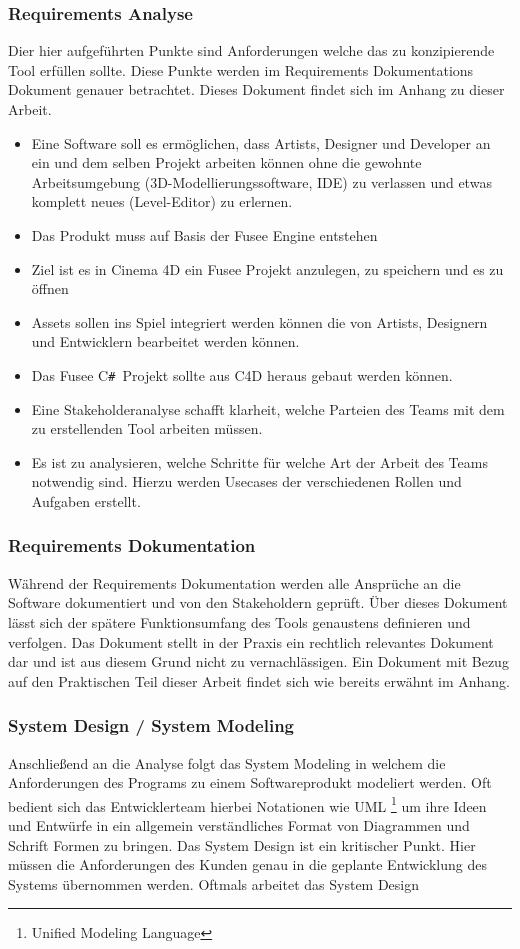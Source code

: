 \documentclass[pagesize, paper=a4, fontsize=12pt, titlepage=true, headings=small, headnosepline, abstractoff, liststotoc, nochapterprefix, plainheadsepline, twoside]{scrreprt}
\newcommand{\CSS}{C\texttt{\# }}
\begin{document}
\subsubsection{Requirements Analyse}
Dier hier aufgeführten Punkte sind Anforderungen welche das zu konzipierende Tool erfüllen sollte. Diese Punkte werden im Requirements Dokumentations Dokument genauer betrachtet. Dieses Dokument findet sich im Anhang zu dieser Arbeit.
\begin{itemize}
\item Eine Software soll es ermöglichen, dass Artists, Designer und Developer an ein und dem selben Projekt arbeiten können ohne die gewohnte Arbeitsumgebung (3D-Modellierungssoftware, IDE) zu verlassen und etwas komplett neues (Level-Editor) zu erlernen.
\item Das Produkt muss auf Basis der Fusee Engine entstehen
\item Ziel ist es in Cinema 4D ein Fusee Projekt anzulegen, zu speichern und es zu öffnen
\item Assets sollen ins Spiel integriert werden können die von Artists, Designern und Entwicklern bearbeitet werden können.
\item Das Fusee \CSS Projekt sollte aus C4D heraus gebaut werden können.
\item Eine Stakeholderanalyse schafft klarheit, welche Parteien des Teams mit dem zu erstellenden Tool arbeiten müssen.
\item Es ist zu analysieren, welche Schritte für welche Art der Arbeit des Teams notwendig sind. Hierzu werden Usecases der verschiedenen Rollen und Aufgaben erstellt.
\end{itemize}
\subsubsection{Requirements Dokumentation}
Während der Requirements Dokumentation werden alle Ansprüche an die Software dokumentiert und von den Stakeholdern geprüft. Über dieses Dokument lässt sich der spätere Funktionsumfang des Tools genaustens definieren und verfolgen. Das Dokument stellt in der Praxis ein rechtlich relevantes Dokument dar und ist aus diesem Grund nicht zu vernachlässigen. Ein Dokument mit Bezug auf den Praktischen Teil dieser Arbeit findet sich wie bereits erwähnt im Anhang.

\subsubsection{System Design / System Modeling}
Anschließend an die Analyse folgt das System Modeling in welchem die Anforderungen des Programs zu einem Softwareprodukt modeliert werden. Oft bedient sich das Entwicklerteam hierbei Notationen wie UML \footnote{Unified Modeling Language} um ihre Ideen und Entwürfe in ein allgemein verständliches Format von Diagrammen und Schrift Formen zu bringen. Das System Design ist ein kritischer Punkt. Hier müssen die Anforderungen des Kunden genau in die geplante Entwicklung des Systems übernommen werden. Oftmals arbeitet das System Design 
\end{document}
